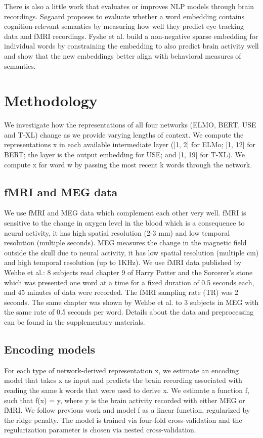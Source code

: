\documentclass{article}
\begin{document}
There is also a little work that evaluates or improves NLP models through brain recordings. Søgaard\cite{sogaard2016evaluating} proposes to evaluate whether a word embedding contains cognition-relevant semantics by measuring how well they predict eye tracking data and fMRI recordings. Fyshe et al.\cite{fyshe2014interpretable} build a non-negative sparse embedding for individual words by constraining the embedding to also predict brain activity well and show that the new embeddings better align with behavioral measures of semantics.


\section{Methodology}\label{sec:methodology}

We investigate how the representations of all four networks (ELMO, BERT, USE and T-XL) change as we provide varying lengths of context. We compute the representations x in each available intermediate layer ([1, 2] for ELMo; [1, 12] for BERT; the layer is the output embedding for USE; and [1, 19] for T-XL). We compute x for word w by passing the most recent k words through the network.

\subsection{fMRI and MEG data} 
We use fMRI and MEG data which complement each other very well. fMRI is sensitive to the change in oxygen level in the blood which is a consequence to neural activity, it has high spatial resolution (2-3 mm) and low temporal resolution (multiple seconds). MEG measures the change in the magnetic field outside the skull due to neural activity, it has low spatial resolution (multiple cm) and high temporal resolution (up to 1KHz). We use fMRI data published by Wehbe et al.\cite{wehbe2014simultaneously}: 8 subjects read chapter 9 of Harry Potter and the Sorcerer’s stone\cite{rowling2012harry} which was presented one word at a time for a fixed duration of 0.5 seconds each, and 45 minutes of data were recorded. The fMRI sampling rate (TR) was 2 seconds. The same chapter was shown by Wehbe et al.\cite{wehbe2014aligning} to 3 subjects in MEG with the same rate of 0.5 seconds per word. Details about the data and preprocessing can be found in the supplementary materials.

\subsection{Encoding models} 
For each type of network-derived representation x, we estimate an encoding model that takes x as input and predicts the brain recording associated with reading the same k words that were used to derive x. We estimate a function f, such that f(x) = y, where y is the brain activity recorded with either MEG or fMRI. We follow previous work\cite{wehbe2014simultaneously} and model f as a linear function, regularized by the ridge penalty. The model is trained via four-fold cross-validation and the regularization parameter is chosen via nested cross-validation.
\end{document}
